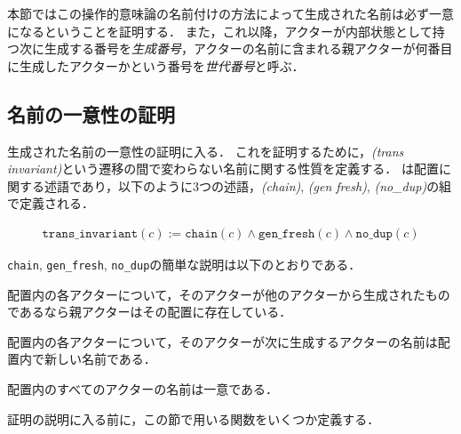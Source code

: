 本節ではこの操作的意味論の名前付けの方法によって生成された名前は必ず一意になるということを証明する．
また，これ以降，アクターが内部状態として持つ次に生成する番号を\emph{生成番号}，アクターの名前に含まれる親アクターが何番目に生成したアクターかという番号を\emph{世代番号}と呼ぶ．

\subsection{名前の一意性の証明}

生成された名前の一意性の証明に入る．
これを証明するために，\emph{\transinv(trans invariant)}という遷移の間で変わらない名前に関する性質を定義する．
\transinv は配置に関する述語であり，以下のように3つの述語，\emph{\chain (chain)}, \emph{\fresh (gen fresh)}, \emph{\nodup (no\_dup)}の組で定義される．

\begin{definition}{\transinv}
\begin{displaymath}
  \begin{array}{l}
    \texttt{trans\_invariant}(c) :=
    \texttt{chain}(c) \wedge \texttt{gen\_fresh}(c) \wedge \texttt{no\_dup}(c)
  \end{array}
\end{displaymath}
\end{definition}

\texttt{chain}, \texttt{gen\_fresh}, \texttt{no\_dup}の簡単な説明は以下のとおりである．

\begin{description}[style=nextline,leftmargin=12pt,parsep=0pt]
\item[\chain]
  配置内の各アクターについて，そのアクターが他のアクターから生成されたものであるなら親アクターはその配置に存在している．
\item[\fresh]
  配置内の各アクターについて，そのアクターが次に生成するアクターの名前は配置内で新しい名前である．
\item[\nodup]
  配置内のすべてのアクターの名前は一意である．
\end{description}

証明の説明に入る前に，この節で用いる関数をいくつか定義する．


